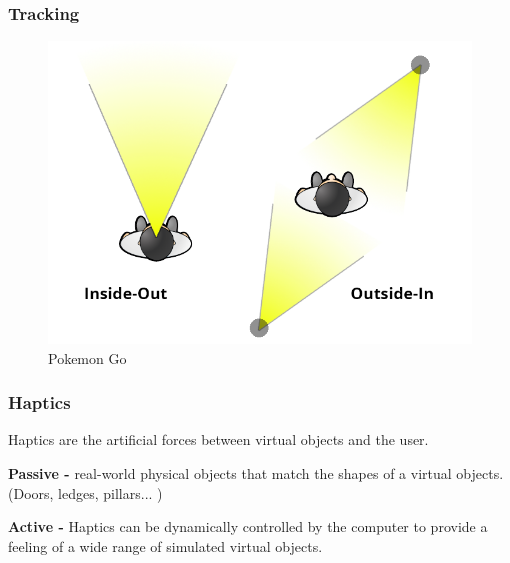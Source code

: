 \begin{frame}
	\frametitle{Tracking}
	\begin{figure}
		\includegraphics[scale=0.25]{assets/tracking.png}
		\caption{Pokemon Go}
	\end{figure}
\end{frame}



\begin{frame}
	\frametitle{Haptics}
	Haptics are the artificial forces between virtual objects and the user.
	\vspace{.2in}
	
	\textbf{Passive -}
	real-world physical objects that match the shapes of a virtual objects. (Doors, ledges, pillars... )
	\vspace{.2in}
	
	\textbf{Active -} Haptics can be dynamically controlled by the computer to provide a feeling of a wide range of simulated virtual objects.
	
\end{frame}

